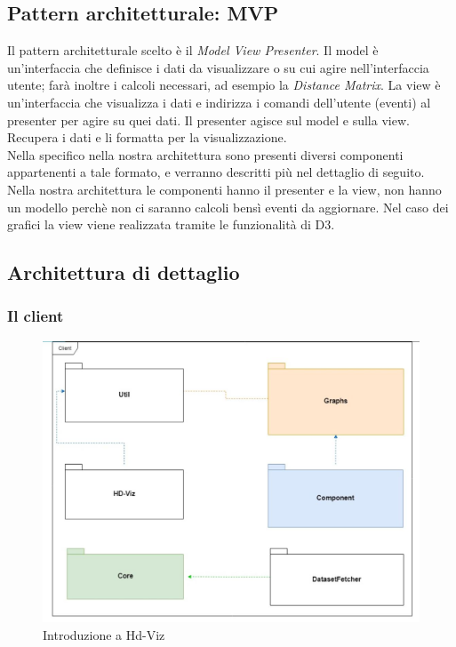 \documentclass[../manuale_sviluppatore.tex]{subfiles}
\begin{document}
\subsection{Pattern architetturale: MVP}
Il pattern architetturale scelto è il \emph{Model View Presenter}. 
Il model è un'interfaccia che definisce i dati da visualizzare o su cui agire nell'interfaccia utente; farà inoltre i calcoli necessari, ad esempio la \emph{Distance Matrix}.
La view è un'interfaccia che visualizza i dati e indirizza i comandi dell'utente (eventi) al presenter per agire su quei dati.
Il presenter agisce sul model e sulla view. Recupera i dati e li formatta per la visualizzazione.\\
Nella specifico nella nostra architettura sono presenti diversi componenti appartenenti a tale formato, e verranno descritti più nel dettaglio di seguito.\\
Nella nostra architettura le componenti hanno il presenter e la view, non hanno un modello perchè non ci saranno calcoli bensì eventi da aggiornare. Nel caso dei
grafici la view viene realizzata tramite le funzionalità di D3.

\subsection{Architettura di dettaglio}
\subsubsection{Il client}

\begin{figure}[H]
	\centering
	\includegraphics[width=18cm]{img/core.jpg}
	\caption{Introduzione a Hd-Viz}
\end{figure}
\end{document}

